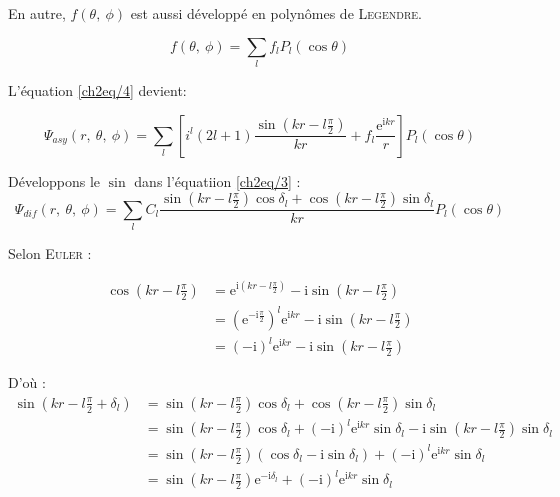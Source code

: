 \documentclass[12pt,a4paper,oneside,french]{book}
\renewcommand{\i}{\mathrm{i}}
\newcommand{\e}{\mathrm{e}}
\theoremstyle{definition}
\theoremstyle{definition}
\theoremstyle{definition}
\theoremstyle{remark}
\theoremstyle{definition}
\begin{document}
    En autre, $f(\theta, \ \phi)$ est aussi développé en polynômes de \textsc{Legendre}.
    
    \begin{equation*}
        f(\theta, \ \phi) = \sum_{l} {f}_{l} {P}_{l}(\cos{\theta})
    \end{equation*}
    
    L'équation \eqref{ch2eq/4} devient:

    \begin{equation} \label{ch2eq/5}
        {\Psi}_{asy}(r, \ \theta, \ \phi) = \sum_{l} \left[{i}^{l} (2l + 1) \frac{\sin\left(k r - l \frac{\pi}{2}\right)}{k r} + {f}_{l} \frac{{\e}^{\i k r}}{r}\right] {P}_{l}(\cos{\theta})
    \end{equation}
    
    Développons le $\sin$ dans l'équatiion \eqref{ch2eq/3} :
    \begin{equation*}
        {\Psi}_{dif}(r, \ \theta, \ \phi) = \sum_{l} {C}_{l} \frac{\sin\left(k r - l \frac{\pi}{2}\right) \cos{{\delta}_{l}} + \cos\left(k r - l \frac{\pi}{2}\right) \sin{{\delta}_{l}}}{k r} {P}_{l}(\cos{\theta})
    \end{equation*}
    
    Selon \textsc{Euler} :
    
    \begin{equation*}
    \begin{split}
        \cos\left(k r - l \frac{\pi}{2}\right) 
            &= {\e}^{\i \left(k r - l \frac{\pi}{2}\right)} - \i \sin\left(k r - l \frac{\pi}{2}\right) \\
            &= {\left({\e}^{-\i \frac{\pi}{2}}\right)}^{l} {\e}^{\i k r} - \i \sin\left(k r - l \frac{\pi}{2}\right) \\
            &= {(-\i)}^{l} {\e}^{\i k r} - \i \sin\left(k r - l \frac{\pi}{2}\right)
    \end{split}
    \end{equation*}
    
    D'où :
    \begin{equation*}
    \begin{split}
        \sin\left(k r - l \frac{\pi}{2} + {\delta}_{l}\right) 
            &= \sin\left(k r - l \frac{\pi}{2}\right) \cos{{\delta}_{l}} + \cos\left(k r - l \frac{\pi}{2}\right) \sin{{\delta}_{l}} \\
            &= \sin\left(k r - l \frac{\pi}{2}\right) \cos{{\delta}_{l}} + {(-\i)}^{l} {\e}^{\i k r} \sin{{\delta}_{l}} - \i \sin\left(k r - l \frac{\pi}{2}\right) \sin{{\delta}_{l}} \\
            &= \sin\left(k r - l \frac{\pi}{2}\right) \left(\cos{{\delta}_{l}} - \i \sin{{\delta}_{l}}\right) + {(-\i)}^{l} {\e}^{\i k r} \sin{{\delta}_{l}} \\
            &= \sin\left(k r - l \frac{\pi}{2}\right) {\e}^{-\i {\delta}_{l}} + {(-\i)}^{l} {\e}^{\i k r} \sin{{\delta}_{l}}
    \end{split}
    \end{equation*}
    
\end{document}
